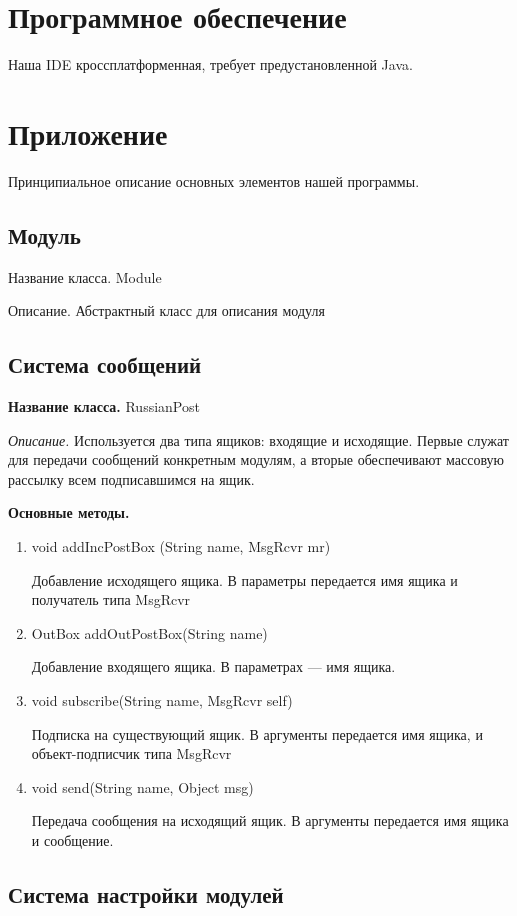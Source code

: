 \documentclass[12pt]{article}
\begin{document}
\section{Программное обеспечение}
Наша IDE кроссплатформенная, требует предустановленной Java. 

\section{Приложение}
Принципиальное описание основных элементов нашей программы.

\subsection{Модуль}
Название класса. Module

Описание. Абстрактный класс для описания модуля


\subsection{Система сообщений}

{\bf Название класса.} RussianPost

\textit{Описание.} Используется два типа ящиков: входящие и исходящие. Первые служат для передачи сообщений конкретным модулям, а вторые обеспечивают массовую рассылку всем подписавшимся на ящик.

\textbf{Основные методы.} 

\begin{enumerate}

\item void addIncPostBox (String name, MsgRcvr mr)

Добавление исходящего ящика. В параметры передается имя ящика и получатель типа MsgRcvr
\item OutBox addOutPostBox(String name)

Добавление входящего ящика. В параметрах --- имя ящика.
\item void subscribe(String name, MsgRcvr self)

Подписка на существующий ящик. В аргументы передается имя ящика, и объект-подписчик типа MsgRcvr 
\item void send(String name, Object msg)

Передача сообщения на исходящий ящик. В аргументы передается имя ящика и сообщение.
\end{enumerate}

\subsection{Система настройки модулей}
\end{document}
